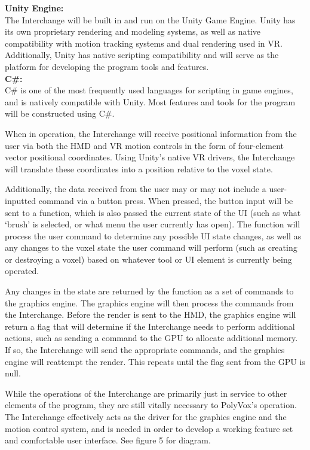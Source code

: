 \documentclass[onecolumn, draftclsnofoot,10pt, compsoc]{IEEEtran}
\newcounter{threesection}[subsubsection]
\newcounter{foursection}[threesection]
\begin{document}
\textbf{Unity Engine:}\\
The Interchange will be built in and run on the Unity Game Engine.
Unity has its own proprietary rendering and modeling systems, as well as native compatibility with motion tracking systems and dual rendering used in VR.
Additionally, Unity has native scripting compatibility and will serve as the platform for developing the program tools and features.\cite{unity}\\
\textbf{C\#:}\\
C\# is one of the most frequently used languages for scripting in game engines, and is natively compatible with Unity.
Most features and tools for the program will be constructed using C\#. 

When in operation, the Interchange will receive positional information from the user via both the HMD and VR motion controls in the form of four-element vector positional coordinates.
Using Unity’s native VR drivers, the Interchange will translate these coordinates into a position relative to the voxel state.

Additionally, the data received from the user may or may not include a user-inputted command via a button press.
When pressed, the button input will be sent to a function, which is also passed the current state of the UI (such as what ‘brush’ is selected, or what menu the user currently has open).
The function will process the user command to determine any possible UI state changes, as well as any changes to the voxel state the user command will perform (such as creating or destroying a voxel) based on whatever tool or UI element is currently being operated. 

Any changes in the state are returned by the function as a set of commands to the graphics engine.
The graphics engine will then process the commands from the Interchange.
Before the render is sent to the HMD, the graphics engine will return a flag that will determine if the Interchange needs to perform additional actions, such as sending a command to the GPU to allocate additional memory.
If so, the Interchange will send the appropriate commands, and the graphics engine will reattempt the render. This repeats until the flag sent from the GPU is null. 

While the operations of the Interchange are primarily just in service to other elements of the program, they are still vitally necessary to PolyVox’s operation.
The Interchange effectively acts as the driver for the graphics engine and the motion control system, and is needed in order to develop a working feature set and comfortable user interface. 
See figure 5 for diagram.
\end{document}

